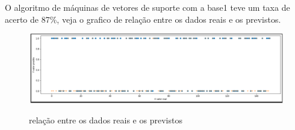 O algoritmo de máquinas de vetores de suporte com a base1 teve um taxa de acerto de 87\%, veja o grafico de relação entre os dados reais e os previstos.
\begin{figure}[htbp]
	\begin{center}
		\includegraphics[width=0.7\linewidth]{imagens/SVMAPI.png}\\
	\end{center}
	\caption[relação entre os dados reais e os previstos]{relação entre os dados reais e os previstos}
	\label{fig:logo}
\end{figure}


